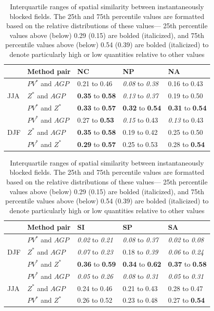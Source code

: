 \documentclass[smallextended]{svjour3}       %
\numberwithin{equation}{section}
\begin{document}
\begin{table}
\centering

\caption{ Interquartile ranges of spatial similarity between instantaneously blocked fields. The 25th and 75th percentile values are formatted based on the relative distributions of these values--- 25th percentile values above (below) 0.29 (0.15) are bolded (italicized), and 75th percentile values above (below) 0.54 (0.39) are bolded (italicized) to denote particularly high or low quantities relative to other values}
\label{simtabcol}
\begin{tabular}{|l|l|l|l|l|}
\hline
  & Method pair & NC    & NP    & NA    \\ \hline
\multirow{3}{*}{JJA} 
   & $PV^* $ and $AGP$    & {0.21} to {0.46} & \textit{0.08} to \textit{0.38} & {0.16} to {0.43}  \\  
   & $Z^*$ and $AGP$   & \textbf{0.35} to \textbf{0.58} & \textit{0.13} to \textit{0.37} & {0.19} to {0.50}  \\   
   & $PV^*$ and $Z^*$   & \textbf{0.33} to \textbf{0.57} & \textbf{0.32} to \textbf{0.54} & \textbf{0.31} to \textbf{0.54}  \\ 
   \hline
\multirow{3}{*}{DJF}
  & $PV^*$ and $AGP$ & {0.27} to \textbf{0.53} & \textit{0.15} to {0.43} & \textit{0.13} to {0.43} \\   
  & $Z^*$ and $AGP$ & \textbf{0.35} to \textbf{0.58} & {0.19} to {0.42} & 0.25 to {0.50} \\ 
  & $PV^*$ and $Z^*$   & \textbf{0.29} to \textbf{0.57} & {0.25} to {0.53} & {0.28} to \textbf{0.54} \\  
  \hline
\end{tabular}
\begin{tabular}{|l|l|l|l|l|}
\hline
  & Method pair & SI    & SP    & SA      \\ \hline

\multirow{3}{*}{DJF}
  & $PV^*$ and $AGP$  & \textit{0.02} to \textit{0.21} & \textit{0.08} to \textit{0.37} & \textit{0.02} to \textit{0.08} \\   
  & $Z^*$ and $AGP$ & \textit{0.07} to \textit{0.23} & {0.18} to \textit{0.39} & \textit{0.06} to \textit{0.24} \\ 
  & $PV^*$ and $Z^*$  & \textbf{0.36} to \textbf{0.59} & \textbf{0.34} to \textbf{0.62} & \textbf{0.37} to \textbf{0.58} \\  
  \hline
  \multirow{3}{*}{JJA} 
   & $PV^* $ and $AGP$    & \textit{0.05} to \textit{0.26} & \textit{0.08} to \textit{0.31} & \textit{0.05} to \textit{0.31} \\  
   & $Z^*$ and $AGP$   & {0.24} to {0.46} & {0.21} to {0.43} & {0.28} to {0.47} \\   
   & $PV^*$ and $Z^*$   & {0.26} to {0.52} & {0.23} to {0.48} & {0.27} to \textbf{0.54} \\ 
  \hline
\end{tabular}

\end{table}
\end{document}
